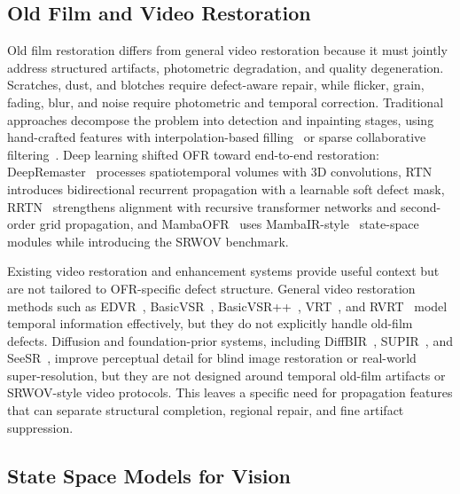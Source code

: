 \documentclass[symmetry,article,submit,pdftex,moreauthors]{Definitions/mdpi}
\begin{document}
\subsection{Old Film and Video Restoration}
\label{subsec:ofr}

Old film restoration differs from general video restoration because it must jointly address structured artifacts, photometric degradation, and quality degeneration. Scratches, dust, and blotches require defect-aware repair, while flicker, grain, fading, blur, and noise require photometric and temporal correction. Traditional approaches decompose the problem into detection and inpainting stages, using hand-crafted features with interpolation-based filling~\cite{kokaram2004missing} or sparse collaborative filtering~\cite{dabov2007bm3d,he2013guided}. Deep learning shifted OFR toward end-to-end restoration: DeepRemaster~\cite{iizuka2019deepremaster} processes spatiotemporal volumes with 3D convolutions, RTN~\cite{wan2022rtn} introduces bidirectional recurrent propagation with a learnable soft defect mask, RRTN~\cite{lin2024rrtn} strengthens alignment with recursive transformer networks and second-order grid propagation, and MambaOFR~\cite{mao2025mambaofr} uses MambaIR-style~\cite{guo2024mambair} state-space modules while introducing the SRWOV benchmark.

Existing video restoration and enhancement systems provide useful context but are not tailored to OFR-specific defect structure. General video restoration methods such as EDVR~\cite{wang2019edvr}, BasicVSR~\cite{chan2021basicvsr}, BasicVSR++~\cite{chan2022basicvsrpp}, VRT~\cite{liang2024vrt}, and RVRT~\cite{liang2022rvrt} model temporal information effectively, but they do not explicitly handle old-film defects. Diffusion and foundation-prior systems, including DiffBIR~\cite{lin2024diffbir}, SUPIR~\cite{yu2024supir}, and SeeSR~\cite{wu2024seesr}, improve perceptual detail for blind image restoration or real-world super-resolution, but they are not designed around temporal old-film artifacts or SRWOV-style video protocols. This leaves a specific need for propagation features that can separate structural completion, regional repair, and fine artifact suppression.

\subsection{State Space Models for Vision}
\label{subsec:ssm}
\end{document}
